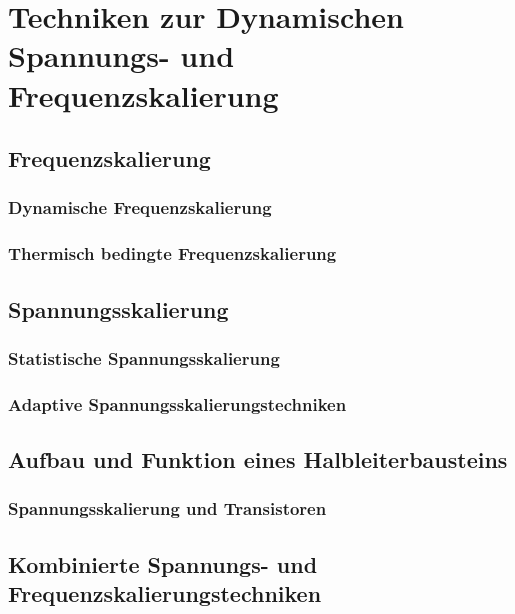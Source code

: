 \documentclass[footmark=none]{tubaf-thesis}
\begin{document}
    
    
    \chapter{Techniken zur Dynamischen Spannungs- und Frequenzskalierung}
    
    	\section{Frequenzskalierung}
    	
    		\subsection{Dynamische Frequenzskalierung}
    		
    		\subsection{Thermisch bedingte Frequenzskalierung}
    
    	\section{Spannungsskalierung}
    	
        	\subsection{Statistische Spannungsskalierung}
        	
        	\subsection{Adaptive Spannungsskalierungstechniken}
        	
		\section{Aufbau und Funktion eines Halbleiterbausteins}
        
        	\subsection{Spannungsskalierung und Transistoren}
        	
        \section{Kombinierte Spannungs- und Frequenzskalierungstechniken}
        
\end{document}
